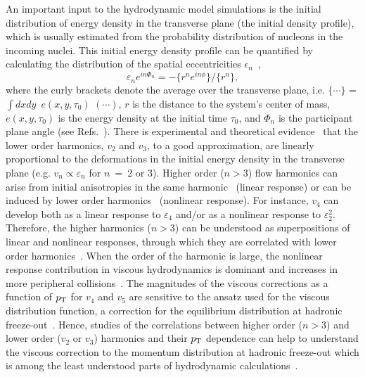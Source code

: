 An important input to the hydrodynamic model simulations is the initial distribution of energy density in the transverse plane (the initial density profile), which is usually estimated from the probability distribution of nucleons in the incoming nuclei.
This initial energy density profile can be quantified by calculating the distribution of the spatial eccentricities $\epsilon_n$~\cite{Alver:2010gr},
\begin{equation}
 \varepsilon_{n} e^{in\Phi_{n}} = -\{r^n e^{in\phi}\}/ \{r^n\},
  \label{eq:eccentricities}
\end{equation}
where the curly brackets denote the average over the transverse plane, i.e. $\{\cdots\}$ = $\int dxdy$\, $e(x,y,\tau_0)$ $(\cdots)$, $r$ is the distance to the system's center of mass, $e(x,y,\tau_0)$ is the energy density at the initial time $\tau_0$, and $\Phi_{n}$ is the participant plane angle (see Refs.~\cite{Teaney:2010vd,Niemi:2015qia}).
There is experimental and theoretical evidence~\cite{Alver:2010gr,Qiu:2011iv,ALICE:2011ab} that the lower order harmonics, $v_2$ and $v_3$, to a good approximation, are linearly proportional to the deformations in the initial energy density in the transverse plane (e.g. $v_n \propto \varepsilon_n$ for $n~=~$2 or 3).
Higher order ($n > 3$) flow harmonics can arise from initial anisotropies in the same harmonic~\cite{Alver:2010gr,Teaney:2010vd,Gubser:2010ui,Hatta:2014jva} (linear response) or can be induced by lower order harmonics~\cite{Bravina:2013xla,Bravina:2013ora} (nonlinear response).
For instance, $v_4$ can develop both as a linear response to $\varepsilon_4$ and/or as a nonlinear response to $\varepsilon_2^2$.
Therefore, the higher harmonics ($n > 3$) can be understood as superpositions of linear and nonlinear responses, through which they are correlated with lower order harmonics~\cite{Teaney:2012ke,Bravina:2013ora,Gubser:2010ui,Hatta:2014jva}. When the order of the harmonic is large, the nonlinear response contribution in viscous hydrodynamics is dominant and increases in more peripheral collisions~\cite{Teaney:2012ke,Bravina:2013ora}.
The magnitudes of the viscous corrections as a function of $p_{\rm T}$ for $v_4$ and $v_5$ are sensitive to the ansatz used for the viscous distribution function, a correction for the equilibrium distribution at hadronic freeze-out~\cite{Luzum:2010ad,Teaney:2012ke}.
Hence, studies of the correlations between higher order ($n>3$) and lower order ($v_2$ or $v_3$) harmonics and their $p_{\rm T}$ dependence can help to understand the viscous correction to the momentum distribution at hadronic freeze-out which is among the least understood parts of hydrodynamic calculations~\cite{Dusling:2009df,Teaney:2012ke,Molnar:2014fva,Niemi:2015qia}.

